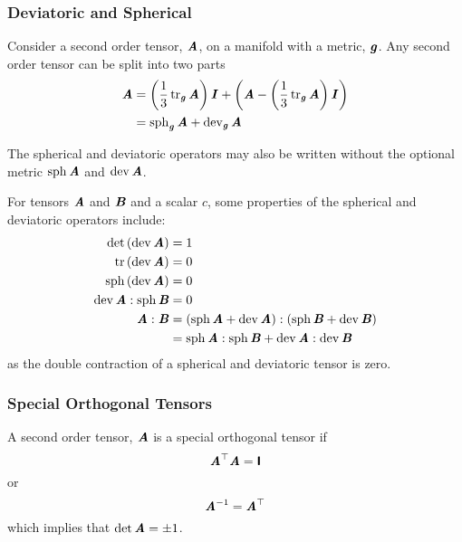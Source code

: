 \subsubsection{Deviatoric and Spherical}
\label{subsubsec:DeviatoricSpherical}

Consider a second order tensor, $\boldsymbol{\mathit{A}}$, on a manifold with a metric,
$\boldsymbol{\mathit{g}}$. Any second order tensor can be split into two parts \ie
\begin{align}
  \tensor{A}&=\pbrac{\frac{1}{3}\trace{\tensor{g}}{\tensor{A}}}\tensor{I}+\pbrac{\tensor{A}-\pbrac{\frac{1}{3}\trace{\tensor{g}}{\tensor{A}}}\tensor{I}}
  \notag \\
  &=\spherical{\tensor{g}}{\tensor{A}}+\deviatoric{\tensor{g}}{\tensor{A}}
\end{align}

The spherical and deviatoric operators may also be written without the
optional metric \ie $\spherical{}{\tensor{A}}$ and $\deviatoric{}{\tensor{A}}$.

For tensors $\boldsymbol{\mathit{A}}$ and $\boldsymbol{\mathit{B}}$ and a scalar $c$, some properties of
the spherical and deviatoric operators include:
\begin{align}
  \determinant{\pbrac{\deviatoric{}{\tensor{A}}}}&=1\\
  \trace{}{\pbrac{\deviatoric{}{\tensor{A}}}}&=0\\
  \spherical{}{\pbrac{\deviatoric{}{\tensor{A}}}}&=0\\
  \doubledotprod{\deviatoric{}{\tensor{A}}}{\spherical{}{\tensor{B}}}&=0 \\
  \doubledotprod{\tensor{A}}{\tensor{B}}&=\doubledotprod{\pbrac{\spherical{}{\tensor{A}}+\deviatoric{}{\tensor{A}}}}{\pbrac{\spherical{}{\tensor{B}}+\deviatoric{}{\tensor{B}}}}
  \notag \\
  &=\doubledotprod{\spherical{}{\tensor{A}}}{\spherical{}{\tensor{B}}}+\doubledotprod{\deviatoric{}{\tensor{A}}}{\deviatoric{}{\tensor{B}}}
\end{align}
as the double contraction of a spherical and deviatoric tensor is zero.

\subsubsection{Special Orthogonal Tensors}
\label{subsubsec:SpecialOrthogonalTensorTwo}

A second order tensor, $\boldsymbol{\mathit{A}}$ is a special orthogonal tensor if
\begin{equation}
   {\ensuremath{\boldsymbol{\mathit{A}}}}^{ \top } \boldsymbol{\mathit{A}}=  \boldsymbol{\mathsf{ I }}  
\end{equation}
or
\begin{equation}
  {\ensuremath{\boldsymbol{\mathit{A}}}}^{-1}= {\boldsymbol{\mathit{A}}}^{ \top } 
\end{equation}
which implies that $\det \boldsymbol{\mathit{A}}=\pm 1$.

